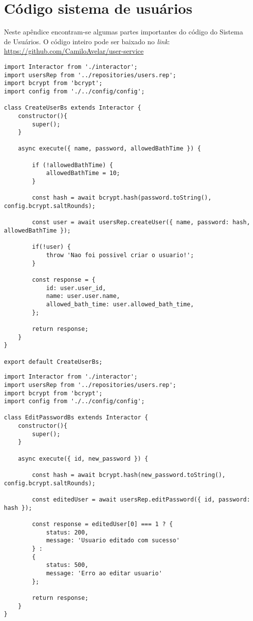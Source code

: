 \chapter{Código sistema de usuários} \label{ap:users}

Neste apêndice encontram-se algumas partes importantes do código do Sistema de Usuários. O código inteiro pode ser baixado no \textit{link}: \url{https://github.com/CamiloAvelar/user-service}

\begin{lstlisting}[caption=Exemplo do código do \textit{interactor} de criação do usuário]
import Interactor from './interactor';
import usersRep from '../repositories/users.rep';
import bcrypt from 'bcrypt';
import config from './../config/config';

class CreateUserBs extends Interactor {
	constructor(){
		super();
	}
	
	async execute({ name, password, allowedBathTime }) {
	
		if (!allowedBathTime) {
			allowedBathTime = 10;
		}
	
		const hash = await bcrypt.hash(password.toString(), config.bcrypt.saltRounds);
	
		const user = await usersRep.createUser({ name, password: hash, allowedBathTime });
		
		if(!user) {
			throw 'Nao foi possivel criar o usuario!';
		}
		
		const response = {
			id: user.user_id,
			name: user.user.name,
			allowed_bath_time: user.allowed_bath_time,
		};
		
		return response;
	}
}

export default CreateUserBs;
\end{lstlisting}

\begin{lstlisting}[caption=Exemplo do código do \textit{interactor} de edição de senha de usuários]
import Interactor from './interactor';
import usersRep from '../repositories/users.rep';
import bcrypt from 'bcrypt';
import config from './../config/config';

class EditPasswordBs extends Interactor {
	constructor(){
		super();
	}
	
	async execute({ id, new_password }) {
	
		const hash = await bcrypt.hash(new_password.toString(), config.bcrypt.saltRounds);
		
		const editedUser = await usersRep.editPassword({ id, password: hash });
		
		const response = editedUser[0] === 1 ? {
			status: 200,
			message: 'Usuario editado com sucesso'
		} : 
		{
			status: 500,
			message: 'Erro ao editar usuario'
		};
		
		return response;
	}
}
\end{lstlisting}


